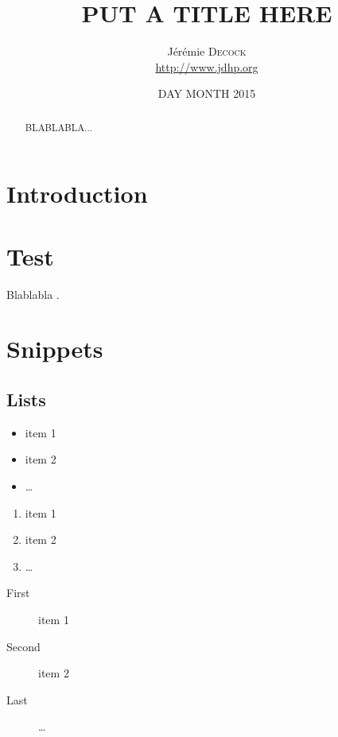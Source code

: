 \documentclass{article}
\title{PUT A TITLE HERE}
\author{Jérémie \textsc{Decock} \\ \url{http://www.jdhp.org}}
\date{DAY MONTH 2015}
\begin{document}
\maketitle

\begin{abstract}
  BLABLABLA...
\end{abstract}

\tableofcontents


\section*{Introduction}\label{sec:intro}



\section{Test}\label{sec:test}

Blablabla \cite{decock:hal-00755663}.



\section{Snippets}\label{sec:snippets}

\subsection{Lists}\label{subsec:lists}

\begin{itemize}
    \item item 1
    \item item 2
    \item \dots
\end{itemize}

\begin{enumerate}
    \item item 1
    \item item 2
    \item \dots
\end{enumerate}

\begin{description}
    \item[First] item 1
    \item[Second] item 2
    \item[Last] \dots
\end{description}
\end{document}
